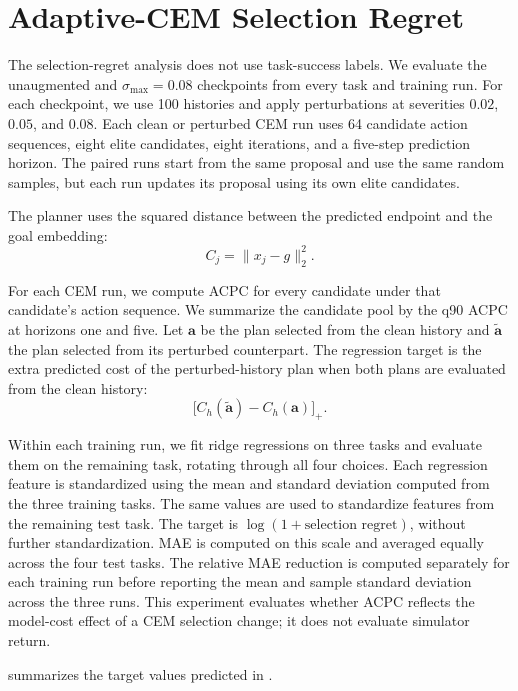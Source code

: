 \documentclass{article}
\newcommand{\stdmax}{\ensuremath{\sigma_{\max}}}
\begin{document}
\FloatBarrier
\section{Adaptive-CEM Selection Regret}
\label{sec:appendix-planner-protocol}

The selection-regret analysis does not use task-success labels. We evaluate
the unaugmented and $\stdmax{}=0.08$ checkpoints from every task and training
run. For each checkpoint, we use 100 histories and apply perturbations at
severities $0.02$, $0.05$, and $0.08$. Each clean or perturbed CEM run uses 64
candidate action sequences, eight elite candidates, eight iterations, and a
five-step prediction horizon. The paired runs start from the same proposal and
use the same random samples, but each run updates its proposal using its own
elite candidates.

The planner uses the squared distance between the predicted endpoint and the
goal embedding:
\[
C_j=\|x_j-g\|_2^2.
\]

For each CEM run, we compute ACPC for every candidate under that candidate's
action sequence. We summarize the candidate pool by the q90 ACPC at horizons
one and five. Let $\mathbf a$ be the plan selected from the clean history and
$\tilde{\mathbf a}$ the plan selected from its perturbed counterpart. The
regression target is the extra predicted cost of the perturbed-history plan
when both plans are evaluated from the clean history:
\[
\bigl[C_h(\tilde{\mathbf a})-C_h(\mathbf a)\bigr]_+.
\]

Within each training run, we fit ridge regressions on three tasks and evaluate
them on the remaining task, rotating through all four choices.
Each regression feature is standardized using the mean and standard deviation
computed from the three training tasks. The same values are used to standardize
features from the remaining test task. The target is
$\log(1+\text{selection regret})$, without further standardization. MAE is
computed on this scale and averaged equally across the four test tasks.
The relative MAE reduction is computed separately for each
training run before reporting the mean and sample standard deviation across
the three runs. This experiment evaluates whether ACPC reflects the model-cost
effect of a CEM selection change; it does not evaluate simulator return.

 summarizes the target values predicted in
.

\end{document}
